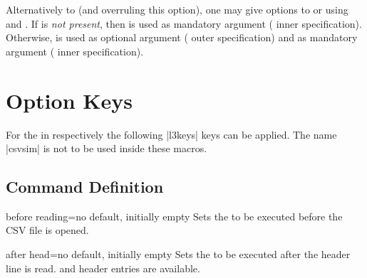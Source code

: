\documentclass[a4paper,11pt]{ltxdoc}
\begin{document}
\begin{docCommands}[
    doc parameter = \oarg{options}\marg{file name}\oarg{taboptions 1}\oarg{taboptions 2},
  ]
\clearpage

Alternatively to 
(and overruling this option), one may give options to
 or 
using  and .
If  is \emph{not present}, then 
is used as
mandatory argument ( inner specification).
Otherwise,  is used as
optional argument ( outer specification)
and
 as
mandatory argument ( inner specification).





\end{docCommands}


\clearpage
\section{Option Keys}\label{sec:schluessel}%
For the  in  respectively 
the following |l3keys| keys can be applied. The  name |csvsim| is not
to be used inside these macros.


\subsection{Command Definition}%

\begin{docCsvKey}{before reading}{=}{no default, initially empty}
  Sets the  to be executed before the CSV file is opened.
\end{docCsvKey}

\begin{docCsvKey}{after head}{=}{no default, initially empty}
  Sets the  to be executed after the header line is read.
   and header entries are available.
\end{docCsvKey}
\end{document}
